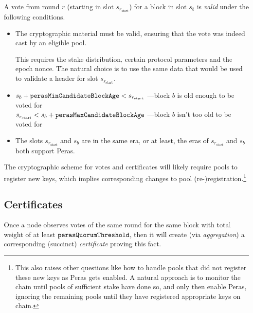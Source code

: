 A vote from round $r$ (starting in slot $s_{r_{\text{start}}}$) for a block in slot $s_b$ is \emph{valid} under the following conditions.
\begin{itemize}
\item
  The cryptographic material must be valid, ensuring that the vote was indeed cast by an eligible pool.

  This requires the stake distribution, certain protocol parameters and the epoch nonce.
  The natural choice is to use the same data that would be used to validate a header for slot $s_{r_{\text{start}}}$.
\item
  $s_b + \mathtt{perasMinCandidateBlockAge} < s_{r_{\text{start}}}$ \quad---\quad block $b$ is old enough to be voted for\\
  $s_{r_{\text{start}}} < s_b + \mathtt{perasMaxCandidateBlockAge}$ \quad---\quad block $b$ isn't too old to be voted for
\item
  The slots $s_{r_{\text{start}}}$ and $s_b$ are in the same era, or at least, the eras of $s_{r_{\text{start}}}$ and $s_b$ both support Peras. %
\end{itemize}

The cryptographic scheme for votes and certificates \parencite{peras-cert-report} will likely require pools to register new keys, which implies corresponding changes to pool (re-)registration.\footnote{
  This also raises other questions like how to handle pools that did not register these new keys as Peras gets enabled.
  A natural approach is to monitor the chain until pools of sufficient stake have done so, and only then enable Peras, ignoring the remaining pools until they have registered appropriate keys on chain.}

\subsection{Certificates}\label{sec:certificate generalities}

Once a node observes votes of the same round for the same block with total weight of at least $\mathtt{perasQuorumThreshold}$, then it will create (via \emph{aggregation}) a corresponding (succinct) \emph{certificate} proving this fact.

